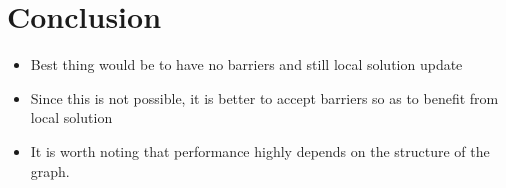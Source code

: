 \section{Conclusion}

\begin{invisible}
 \begin{itemize}
   \item Best thing would be to have no barriers and still local solution update
   \item Since this is not possible, it is better to accept barriers so as to benefit from local solution
   \item It is worth noting that performance highly depends on the structure of the graph.
 \end{itemize}
\end{invisible}